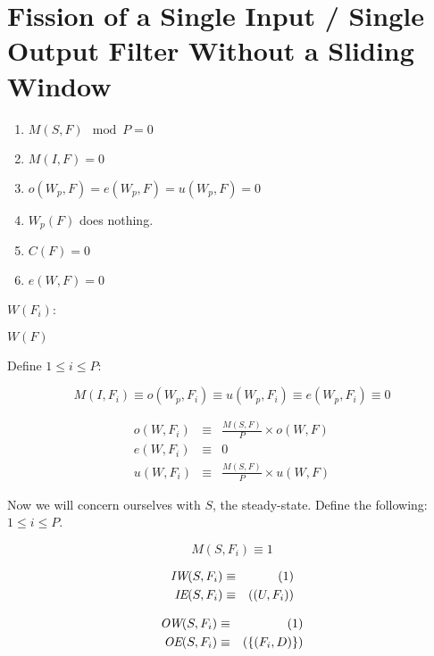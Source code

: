 \section{Fission of a Single Input / Single Output Filter Without a
Sliding Window}
\label{sec:single_nopeek}

\begin{enumerate}

\item $M(S,F) \mod  P = 0$

\item $M(I,F) = 0$

\item $o(W_p,F) = e(W_p,F) = u(W_p,F) = 0$

\item $W_p(F)$ does nothing.

\item $C(F) = 0$

\item $e(W,F) = 0$

\end{enumerate}

\begin{algorithm}
$W(F_i)$:
\begin{algorithmic}[1]
\State $W(F)$
\EndFor
\end{algorithmic}
\end{algorithm}

Define $1 \le i \le P$:

$$ M(I,F_i) \equiv o(W_p,F_i) \equiv u(W_p,F_i) \equiv e(W_p,F_i)
\equiv 0 $$

\begin{eqnarray*} 
o(W,F_i) & \equiv & \frac{M(S,F)}{P} \times o(W,F) \\
e(W,F_i) & \equiv & 0 \\
u(W,F_i) & \equiv & \frac{M(S,F)}{P} \times u(W,F)
\end{eqnarray*} 

Now we will concern ourselves with $S$, the steady-state.  Define the
following: $1 \le i \le P$.
 
$$ M(S,F_i) \equiv 1 $$

\begin{eqnarray*}
\mbox{\it IW}(S,F_i) & \equiv & (1) \\
\mbox{\it IE}(S,F_i) & \equiv & ((U,F_i)) 
\end{eqnarray*}

\begin{eqnarray*} 
\mbox{\it OW}(S,F_i) & \equiv & (1) \\
\mbox{\it OE}(S,F_i) & \equiv & (\{(F_i, D)\}) 
\end{eqnarray*} 

